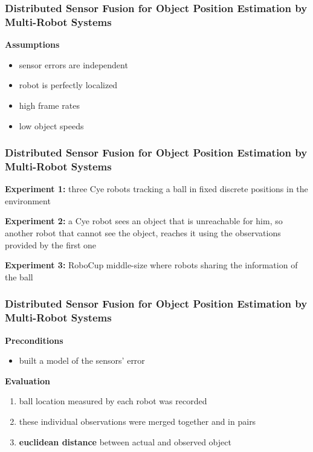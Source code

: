 \begin{frame}
	\frametitle{Distributed Sensor Fusion for Object Position Estimation by Multi-Robot Systems}
	
	\textbf{Assumptions}
	
	\begin{itemize}
		\item sensor errors are independent
		
		\item robot is perfectly localized
		
		\item high frame rates
		
		\item low object speeds
	\end{itemize}
\end{frame}

\begin{frame}
	\frametitle{Distributed Sensor Fusion for Object Position Estimation by Multi-Robot Systems}
	
	\textbf{Experiment 1:} three Cye robots tracking a ball in fixed discrete positions in the environment
	
	\vspace{0.4cm}
	
	\textbf{Experiment 2:} a Cye robot sees an object that is unreachable for him, so another robot that cannot
	see the object, reaches it using the observations provided by the first one
	
	\vspace{0.4cm}
	
	\textbf{Experiment 3:} RoboCup middle-size where robots sharing the information of the ball
\end{frame}

\begin{frame}
	\frametitle{Distributed Sensor Fusion for Object Position Estimation by Multi-Robot Systems}
	
	\vspace{0.7cm}
	
	\textbf{Preconditions}
	
	\begin{itemize}
		\item built a model of the sensors' error
	\end{itemize}
	
	\vspace{0.2cm}
	
	\textbf{Evaluation}
	
	\begin{enumerate}
		\item ball location measured by each robot was recorded
		
		\item these individual observations were merged together and in pairs
		
		\item \textbf{euclidean distance} between actual and observed object
	\end{enumerate}
\end{frame}


